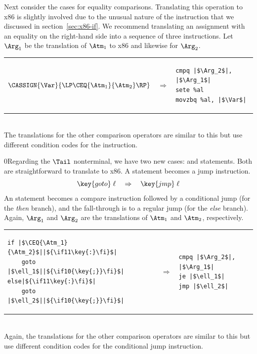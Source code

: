 \documentclass[7x10]{TimesAPriori_MIT}%
\def\racketEd{0}
\def\pythonEd{1}
\def\edition{1}
\newcommand{\racket}[1]{{\if\edition\racketEd{#1}\fi}}
\newcommand{\pythonColor}[0]{}
\newcommand{\python}[1]{{\if\edition\pythonEd\pythonColor #1\fi}}
\numberwithin{theorem}{chapter}
\numberwithin{definition}{chapter}
\numberwithin{equation}{chapter}
\begin{document}
Next consider the cases for equality comparisons.  Translating this
operation to x86 is slightly involved due to the unusual nature of the
 instruction that we discussed in section~\ref{sec:x86-if}.
We recommend translating an assignment with an equality on the
right-hand side into a sequence of three instructions. Let $\Arg_1$
be the translation of $\Atm_1$ to x86 and likewise for $\Arg_2$.\\
\begin{tabular}{lll}
\begin{minipage}{0.4\textwidth}
$\CASSIGN{\Var}{ \LP\CEQ{\Atm_1}{\Atm_2} \RP }$ 
\end{minipage}
&
$\Rightarrow$
&
\begin{minipage}{0.4\textwidth}
\begin{lstlisting}
cmpq |$\Arg_2$|, |$\Arg_1$|
sete %al
movzbq %al, |$\Var$|
\end{lstlisting}
\end{minipage}
\end{tabular}  \\
The translations for the other comparison operators are similar to
this but use different condition codes for the  instruction.

\racket{Regarding the $\Tail$ nonterminal, we have two new cases:
  \key{goto} and \key{if} statements. Both are straightforward to
  translate to x86.}
%
A  statement becomes a jump instruction.
\[
\key{goto}\; \ell\racket{\key{;}} \quad \Rightarrow \quad \key{jmp}\;\ell
\]
%
An  statement becomes a compare instruction followed by a
conditional jump (for the \emph{then} branch), and the fall-through is to
a regular jump (for the \emph{else} branch). Again, $\Arg_1$ and $\Arg_2$
are the translations of $\Atm_1$ and $\Atm_2$, respectively.\\
\begin{tabular}{lll}
\begin{minipage}{0.4\textwidth}
\begin{lstlisting}
if |$\CEQ{\Atm_1}{\Atm_2}$||$\python{\key{:}}$|
    goto |$\ell_1$||$\racket{\key{;}}$|
else|$\python{\key{:}}$|
    goto |$\ell_2$||$\racket{\key{;}}$|
\end{lstlisting}
\end{minipage}
&
$\Rightarrow$
&
\begin{minipage}{0.4\textwidth}
\begin{lstlisting}
cmpq |$\Arg_2$|, |$\Arg_1$|
je |$\ell_1$|
jmp |$\ell_2$|
\end{lstlisting}
\end{minipage}
\end{tabular}  \\
Again, the translations for the other comparison operators are similar to this
but use different condition codes for the conditional jump instruction.
\end{document}
